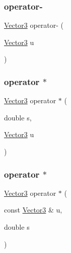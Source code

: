 \mbox{\label{class_vector3_a0e55d4adeebd39752a52dff8a1062bec}} 
\subsubsection{\texorpdfstring{operator-\/}{operator-}\hspace{0.1cm}{\footnotesize\ttfamily [2/2]}}
{\footnotesize\ttfamily \mbox{\hyperlink{class_vector3}{Vector3}} operator-\/ (\begin{DoxyParamCaption}\item[{\mbox{\hyperlink{class_vector3}{Vector3}}}]{u }\end{DoxyParamCaption})\hspace{0.3cm}{\ttfamily [friend]}}

\mbox{\label{class_vector3_acfbed74a82515171cc077011a2512bbe}} 
\subsubsection{\texorpdfstring{operator $\ast$}{operator *}\hspace{0.1cm}{\footnotesize\ttfamily [1/2]}}
{\footnotesize\ttfamily \mbox{\hyperlink{class_vector3}{Vector3}} operator $\ast$ (\begin{DoxyParamCaption}\item[{double}]{s,  }\item[{\mbox{\hyperlink{class_vector3}{Vector3}}}]{u }\end{DoxyParamCaption})\hspace{0.3cm}{\ttfamily [friend]}}

\mbox{\label{class_vector3_a5b45d6f5e835014c7e2636791bf18da2}} 
\subsubsection{\texorpdfstring{operator $\ast$}{operator *}\hspace{0.1cm}{\footnotesize\ttfamily [2/2]}}
{\footnotesize\ttfamily \mbox{\hyperlink{class_vector3}{Vector3}} operator $\ast$ (\begin{DoxyParamCaption}\item[{const \mbox{\hyperlink{class_vector3}{Vector3}} \&}]{u,  }\item[{double}]{s }\end{DoxyParamCaption})\hspace{0.3cm}{\ttfamily [friend]}}

